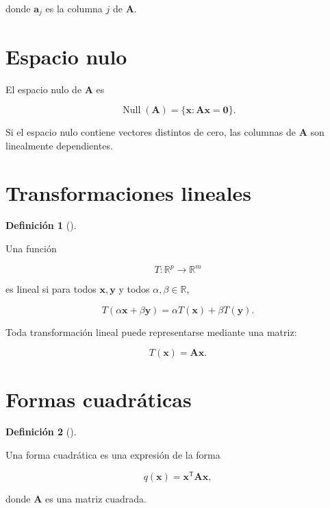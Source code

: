 \documentclass[
  spanish,
  11pt,
  letterpaper,
  DIV=11,
  numbers=noendperiod]{scrreprt}
\theoremstyle{definition}
\newtheorem{definition}{Definición}[chapter]
\theoremstyle{plain}
\theoremstyle{definition}
\theoremstyle{remark}
\begin{document}
donde \(\mathbf{a}_j\) es la columna \(j\) de \(\mathbf{A}\).

\section{Espacio nulo}\label{espacio-nulo}

El espacio nulo de \(\mathbf{A}\) es

\[
\operatorname{Null}(\mathbf{A})
=
\{
\mathbf{x}:
\mathbf{A}\mathbf{x}
=
\mathbf{0}
\}.
\]

Si el espacio nulo contiene vectores distintos de cero, las columnas de
\(\mathbf{A}\) son linealmente dependientes.

\section{Transformaciones lineales}\label{transformaciones-lineales}

\begin{definition}[]\protect\hypertarget{def-transformacion-lineal}{}\label{def-transformacion-lineal}

Una función

\[
T:\mathbb{R}^{p}\to\mathbb{R}^{m}
\]

es lineal si para todos \(\mathbf{x},\mathbf{y}\) y todos
\(\alpha,\beta\in\mathbb{R}\),

\[
T(\alpha\mathbf{x}+\beta\mathbf{y})
=
\alpha T(\mathbf{x})
+
\beta T(\mathbf{y}).
\]

\end{definition}

Toda transformación lineal puede representarse mediante una matriz:

\[
T(\mathbf{x})
=
\mathbf{A}\mathbf{x}.
\]

\section{Formas cuadráticas}\label{formas-cuadruxe1ticas}

\begin{definition}[]\protect\hypertarget{def-forma-cuadratica}{}\label{def-forma-cuadratica}

Una forma cuadrática es una expresión de la forma

\[
q(\mathbf{x})
=
\mathbf{x}^{\mathsf T}
\mathbf{A}
\mathbf{x},
\]

donde \(\mathbf{A}\) es una matriz cuadrada.

\end{definition}
\end{document}
